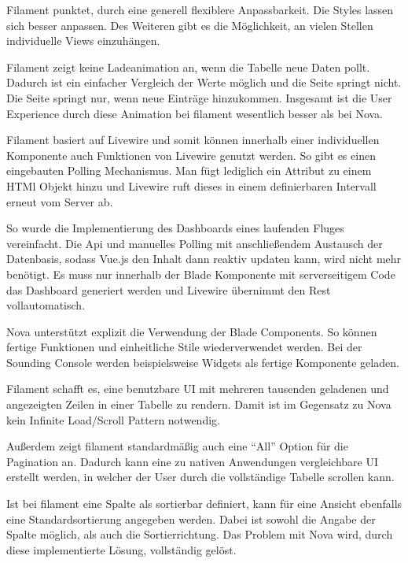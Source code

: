 \newpage

Filament punktet, durch eine generell flexiblere Anpassbarkeit.
Die Styles lassen sich besser anpassen.
Des Weiteren gibt es die Möglichkeit, an vielen Stellen individuelle Views einzuhängen.

Filament zeigt keine Ladeanimation an, wenn die Tabelle neue Daten pollt.
Dadurch ist ein einfacher Vergleich der Werte möglich und die Seite springt nicht.
Die Seite springt nur, wenn neue Einträge hinzukommen.
Insgesamt ist die User Experience durch diese Animation bei filament wesentlich besser als bei Nova.

Filament basiert auf Livewire\cite{livewire} und somit können innerhalb einer individuellen Komponente auch Funktionen von Livewire genutzt werden.
So gibt es einen eingebauten Polling Mechanismus.
Man fügt lediglich ein Attribut zu einem HTMl Objekt hinzu und Livewire ruft dieses in einem definierbaren Intervall erneut vom Server ab.

So wurde die Implementierung des Dashboards eines laufenden Fluges vereinfacht.
Die Api und manuelles Polling mit anschließendem Austausch der Datenbasis, sodass Vue.js den Inhalt dann reaktiv updaten kann, wird nicht mehr benötigt.
Es muss nur innerhalb der Blade Komponente mit serverseitigem Code das Dashboard generiert werden und Livewire übernimmt den Rest vollautomatisch.

Nova unterstützt explizit die Verwendung der Blade Components.
So können fertige Funktionen und einheitliche Stile wiederverwendet werden.
Bei der Sounding Console werden beispielsweise Widgets als fertige Komponente geladen.

\newpage

Filament schafft es, eine benutzbare UI mit mehreren tausenden geladenen und angezeigten Zeilen in einer Tabelle zu rendern.
Damit ist im Gegensatz zu Nova kein Infinite Load/Scroll Pattern notwendig.

Außerdem zeigt filament standardmäßig auch eine \enquote{All} Option für die Pagination an.
Dadurch kann eine zu nativen Anwendungen vergleichbare UI erstellt werden, in welcher der User durch die vollständige Tabelle scrollen kann.

Ist bei filament eine Spalte als sortierbar definiert, kann für eine Ansicht ebenfalls eine Standardsortierung angegeben werden.
Dabei ist sowohl die Angabe der Spalte möglich, als auch die Sortierrichtung.
Das Problem mit Nova wird, durch diese implementierte Lösung, vollständig gelöst.

